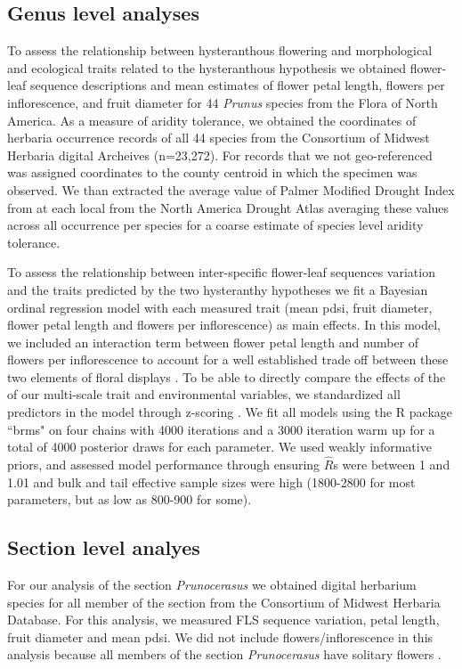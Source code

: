 \documentclass{article}\usepackage[]{graphicx}\usepackage[]{color}
\begin{document}
\subsection{Genus level analyses}
To assess the relationship between hysteranthous flowering and morphological and ecological traits related to the hysteranthous hypothesis we obtained flower-leaf sequence descriptions and mean estimates of flower petal length, flowers per inflorescence, and fruit diameter for 44 \textit{Prunus} species from the Flora of North America. As a measure of aridity tolerance, we obtained the coordinates of herbaria occurrence records of all 44 species from the Consortium of Midwest Herbaria digital Archeives (n=23,272). For records that we not geo-referenced was assigned coordinates to the county centroid in which the specimen was observed. We than extracted the average value of Palmer Modified Drought Index from at each local from the North America Drought Atlas \citep{} averaging these values across all occurrence per species for a coarse estimate of species level aridity tolerance. 

\noindent To assess the relationship between inter-specific flower-leaf sequences variation and the traits predicted by the two hysteranthy hypotheses we fit a Bayesian ordinal regression model with each measured trait (mean pdsi, fruit diameter, flower petal length and flowers per inflorescence) as main effects. In this model, we included an interaction term between flower petal length and number of flowers per inflorescence to account for a well established trade off between these two elements of floral displays \citep{}.
To be able to directly compare the effects of the of our multi-scale trait and environmental variables, we standardized all predictors in the model through z-scoring \citep{}. We fit all models using the R package ``brms" \citep{Burkner2018} on four chains with 4000 iterations and a 3000 iteration warm up for a total of 4000 posterior draws for each parameter. We used weakly informative priors, and assessed model performance through ensuring $\hat{R}$s were between 1 and 1.01 and bulk and tail effective sample sizes were high (1800-2800 for most parameters, but as low as  800-900 for some).


\subsection{Section level analyes}
For our analysis of the section \textit{Prunocerasus} we obtained digital herbarium species for all member of the section from the Consortium of Midwest Herbaria Database. For this analysis, we measured FLS sequence variation, petal length, fruit diameter and mean pdsi. We did not include flowers/inflorescence  in this analysis because all members of the section \textit{Prunocerasus} have solitary flowers \citep{}.
\end{document}
